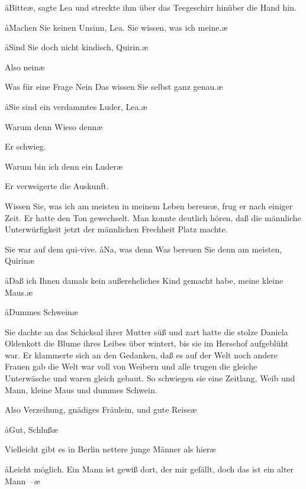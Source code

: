 \aa{}Bitte\ae{}, sagte Lea und streckte ihm über das Teegeschirr hinüber
die Hand hin.

\aa{}Machen Sie keinen Unsinn, Lea. Sie wissen, was ich
meine.\ae{}

\aa{}Sind Sie doch nicht kindisch, Quirin.\ae{}

\aanah{}Also nein\frag{}\ae{}

\aanah{}Was für eine Frage\ausr{} Nein\ausr{} Das wissen Sie selbst ganz
genau.\ae{}

\aa{}Sie sind ein verdammtes Luder, Lea.\ae{}

\aanah{}Warum denn\frag{} Wieso denn\frag{}\ae{}

Er schwieg.

\aanah{}Warum bin ich denn ein Luder\frag{}\ae{}

Er verweigerte die Auskunft.

\aanah{}Wissen Sie, was ich am meisten in meinem Leben bereue\ae{},
frug er nach einiger Zeit. Er hatte den Ton gewechselt. Man
konnte deutlich hören, daß die männliche Unterwürfigkeit jetzt
der männlichen Frechheit Platz machte.

Sie war auf dem qui-vive. \aa{}Na, was denn\frag{} Was bereuen
Sie denn am meisten, Quirin\frag{}\ae{}

\aa{}Daß ich Ihnen damals kein außereheliches Kind gemacht
habe, meine kleine Maus.\ae{}

\aa{}Dummes Schwein\ausr{}\ae{}

Sie dachte an das Schicksal ihrer Mutter\dopp{} süß und zart hatte
die stolze Daniela Oldenkott die Blume ihres Leibes über\-%
wintert, bis sie im Hersehof aufgeblüht war. Er klammerte
sich an den Gedanken, daß es auf der Welt noch andere Frauen
gab\dopp{} die Welt war voll von Weibern und alle trugen die gleiche
Unterwäsche und waren gleich gebaut. So schwiegen sie eine
Zeitlang, Weib und Mann, kleine Maus und dummes
Schwein.

\aanah{}Also Verzeihung, gnädiges Fräulein, und gute Reise\ausr{}\ae{}

\aa{}Gut, Schluß\ausr{}\ae{}

\aanah{}Vielleicht gibt es in Berlin nettere junge Männer als hier\frag{}\ae{}

\aa{}Leicht möglich. Ein Mann ist gewiß dort, der mir gefällt,
doch das ist ein alter Mann~--\ae{}

